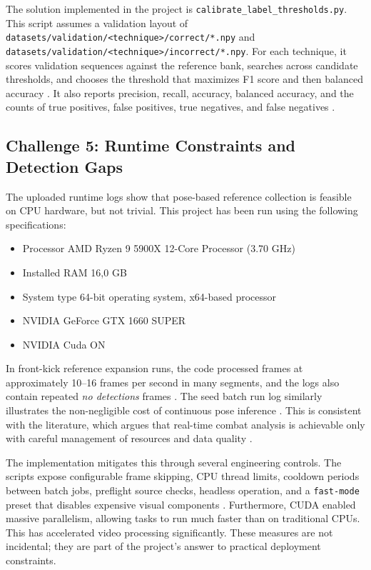 \documentclass[12pt]{article}
\begin{document}
The solution implemented in the project is \texttt{calibrate\_label\_thresholds.py}. This script assumes a validation layout of \texttt{datasets/validation/<technique>/correct/*.npy} and \texttt{datasets/validation/<technique>/incorrect/*.npy}. For each technique, it scores validation sequences against the reference bank, searches across candidate thresholds, and chooses the threshold that maximizes F1 score and then balanced accuracy \cite{projectCalibrate}. It also reports precision, recall, accuracy, balanced accuracy, and the counts of true positives, false positives, true negatives, and false negatives \cite{projectCalibrate}.

\subsection{Challenge 5: Runtime Constraints and Detection Gaps}
The uploaded runtime logs show that pose-based reference collection is feasible on CPU hardware, but not trivial. This project has been run using the following specifications:

\begin{itemize}
    \item Processor	AMD Ryzen 9 5900X 12-Core Processor             (3.70 GHz)
    \item Installed RAM	16,0 GB
    \item System type	64-bit operating system, x64-based processor
    \item NVIDIA GeForce GTX 1660 SUPER
    \item NVIDIA Cuda ON
\end{itemize}

In front-kick reference expansion runs, the code processed frames at approximately 10--16 frames per second in many segments, and the logs also contain repeated \textit{no detections} frames \cite{projectFrontKickLog,projectFrontKickStrictLog}. The seed batch run log similarly illustrates the non-negligible cost of continuous pose inference \cite{projectSeedLog}. This is consistent with the literature, which argues that real-time combat analysis is achievable only with careful management of resources and data quality \cite{quinn2024automation,quinn2025yolo}.

The implementation mitigates this through several engineering controls. The scripts expose configurable frame skipping, CPU thread limits, cooldown periods between batch jobs, preflight source checks, headless operation, and a \texttt{fast-mode} preset that disables expensive visual components \cite{projectActionRecognition,projectRunBatch}. Furthermore, CUDA enabled massive parallelism, allowing tasks to run much faster than on traditional CPUs. This has accelerated video processing significantly. 
These measures are not incidental; they are part of the project's answer to practical deployment constraints.
\end{document}
